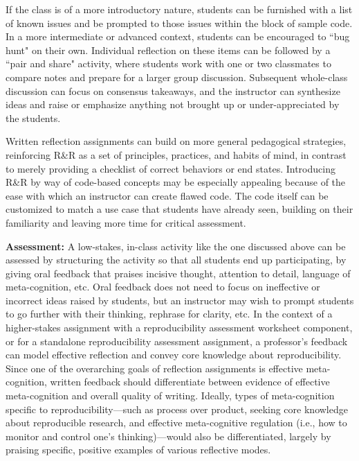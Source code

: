 \documentclass[
  12pt]{article}
\begin{document}
If the class is of a more introductory nature, students can be furnished with a list of known issues and be prompted to those issues within the block of sample code.
In a more intermediate or advanced context, students can be encouraged to ``bug hunt" on their own. 
Individual reflection on these items can be followed by a ``pair and share" activity, where students work with one or two classmates to compare notes and prepare for a larger group discussion. 
Subsequent whole-class discussion can focus on consensus takeaways, and the instructor can synthesize ideas and raise or emphasize anything not brought up or under-appreciated by the students. 

Written reflection assignments can build on more general pedagogical strategies, reinforcing R\&R as a set of principles, practices, and habits of mind, in contrast to merely providing a checklist of correct behaviors or end states. 
Introducing R\&R by way of code-based concepts may be especially appealing because of the ease with which an instructor can create flawed code. 
The code itself can be customized to match a use case that students have already seen, building on their familiarity and leaving more time for critical assessment. 

\textbf{Assessment:}
A low-stakes, in-class activity like the one discussed above can be assessed by structuring the activity so that all students end up participating, by giving oral feedback that praises incisive thought, attention to detail, language of meta-cognition, etc. 
Oral feedback does not need to focus on ineffective or incorrect ideas raised by students, but an instructor may wish to prompt students to go further with their thinking, rephrase for clarity, etc. 
In the context of a higher-stakes assignment with a reproducibility assessment worksheet component, or for a standalone reproducibility assessment assignment, a professor's feedback can model effective reflection and convey core knowledge about reproducibility. 
Since one of the overarching goals of reflection assignments is effective meta-cognition, written feedback should differentiate between evidence of effective meta-cognition and overall quality of writing. 
Ideally, types of meta-cognition specific to reproducibility---such as process over product, seeking core knowledge about reproducible research, and effective meta-cognitive regulation (i.e., how to monitor and control one's thinking)---would also be differentiated, largely by praising specific, positive examples of various reflective modes. 
\end{document}
